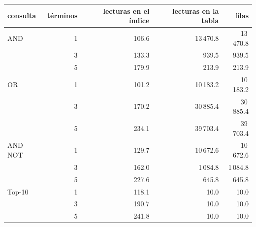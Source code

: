 \begin{tabular}{@{}lrrrr@{}}
\toprule
consulta & términos & lecturas en el índice & lecturas en la tabla & filas \\
\midrule
AND & 1 & 106.6 & 13\,470.8 & 13\,470.8 \\
 & 3 & 133.3 & 939.5 & 939.5 \\
 & 5 & 179.9 & 213.9 & 213.9 \\
OR & 1 & 101.2 & 10\,183.2 & 10\,183.2 \\
 & 3 & 170.2 & 30\,885.4 & 30\,885.4 \\
 & 5 & 234.1 & 39\,703.4 & 39\,703.4 \\
AND NOT & 1 & 129.7 & 10\,672.6 & 10\,672.6 \\
 & 3 & 162.0 & 1\,084.8 & 1\,084.8 \\
 & 5 & 227.6 & 645.8 & 645.8 \\
Top-10 & 1 & 118.1 & 10.0 & 10.0 \\
 & 3 & 190.7 & 10.0 & 10.0 \\
 & 5 & 241.8 & 10.0 & 10.0 \\
\bottomrule
\end{tabular}
